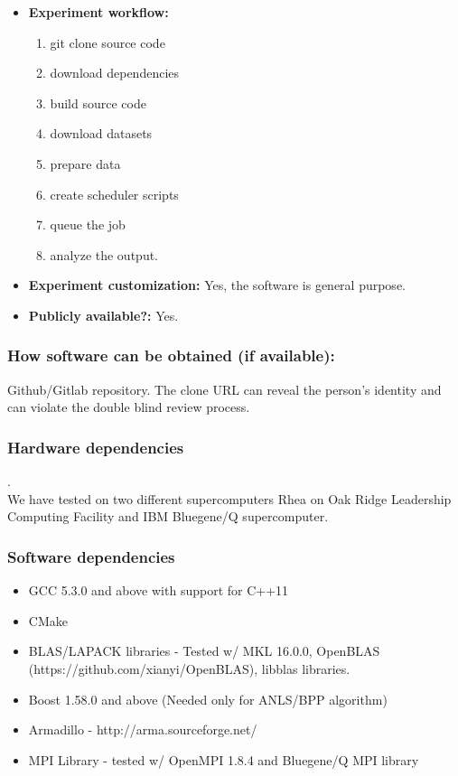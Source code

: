\documentclass[sigconf, review=false]{acmart}
\begin{document}
{\begin{itemize}
  \item {\bf Experiment workflow: }
  \begin{enumerate}
\item   git clone source code
\item download dependencies
\item build source code
\item download datasets
\item prepare data
\item create scheduler scripts
\item queue the job
\item analyze the output.
\end{enumerate}
  \item {\bf Experiment customization: } Yes, the software is general
purpose.
  \item {\bf Publicly available?: } Yes.
\end{itemize}
}

\subsubsection{How software can be obtained (if available):} 
Github/Gitlab repository. The clone URL can reveal the person's identity and can violate the double blind review process. 


\subsubsection{Hardware dependencies}. \\

We have tested on two different supercomputers Rhea on Oak Ridge Leadership Computing Facility and IBM Bluegene/Q supercomputer.  

\subsubsection{Software dependencies} \label{sec:dependencies}

\begin{itemize}
\item GCC 5.3.0 and above with support for C++11
\item CMake
\item BLAS/LAPACK libraries - Tested w/ MKL 16.0.0, OpenBLAS (https://github.com/xianyi/OpenBLAS), libblas libraries. 
\item Boost 1.58.0  and above (Needed only for ANLS/BPP algorithm)
\item Armadillo - http://arma.sourceforge.net/
\item MPI Library - tested w/ OpenMPI 1.8.4 and Bluegene/Q MPI library
\end{itemize}
\end{document}
